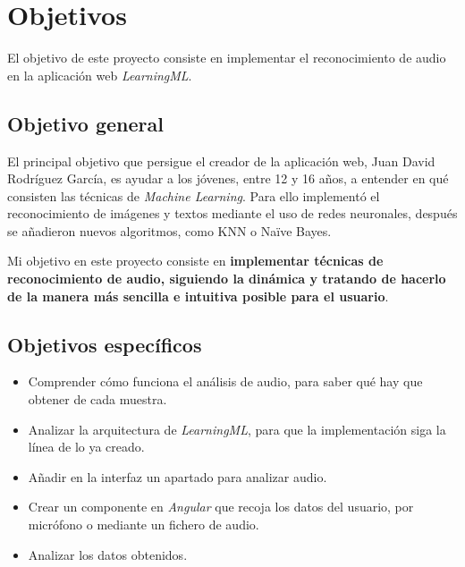 \documentclass[a4paper, 12pt]{book}
\begin{document}
\cleardoublepage %
\chapter{Objetivos} %
\label{chap:objetivos} %

El objetivo de este proyecto consiste en implementar el reconocimiento de audio en la aplicación web \textit{LearningML}.

\section{Objetivo general} %
\label{sec:objetivo-general} %

El principal objetivo que persigue el creador de la aplicación web, Juan David Rodríguez García, es ayudar a los jóvenes, entre 12 y 16 años, a entender en qué consisten las técnicas de \textit{Machine Learning}. Para ello implementó el reconocimiento de imágenes y textos mediante el uso de redes neuronales, después se añadieron nuevos algoritmos, como KNN o Naïve Bayes.

Mi objetivo en este proyecto consiste en {\bf implementar técnicas de reconocimiento de audio, siguiendo la dinámica y tratando de hacerlo de la manera más sencilla e intuitiva posible para el usuario}.

\section{Objetivos específicos}
\label{sec:objetivos-especificos}

\begin{itemize}

  \item Comprender cómo funciona el análisis de audio, para saber qué hay que obtener de cada muestra.
  \item Analizar la arquitectura de \textit{LearningML}, para que la implementación siga la línea de lo ya creado.
  \item Añadir en la interfaz un apartado para analizar audio.
  \item Crear un componente en \textit{Angular} que recoja los datos del usuario, por micrófono o mediante un fichero de audio.
  \item Analizar los datos obtenidos.

\end{itemize}
\end{document}
